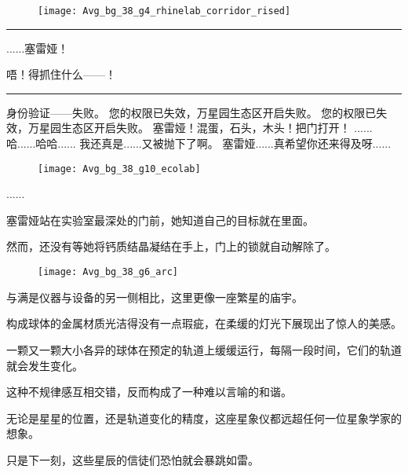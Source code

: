 \documentclass[openany]{book}
\begin{document}
\begin{dialogue}
\begin{figure}[h]
        \centering
        \texttt{[image: Avg\_bg\_38\_g4\_rhinelab\_corridor\_rised]}
    \end{figure}
    \par\noindent\rule{\textwidth}{0.4pt}
     ......塞雷娅！\par
     唔！得抓住什么——！
    \par\noindent\rule{\textwidth}{0.4pt}
     身份验证——失败。
     您的权限已失效，万星园生态区开启失败。
     您的权限已失效，万星园生态区开启失败。
     塞雷娅！混蛋，石头，木头！把门打开！
     ......
     哈......哈哈......
     我还真是......又被抛下了啊。
     塞雷娅......真希望你还来得及呀......
    \begin{figure}[h]
        \centering
        \texttt{[image: Avg\_bg\_38\_g10\_ecolab]}
    \end{figure}
     ......
\end{dialogue}\par

塞雷娅站在实验室最深处的门前，她知道自己的目标就在里面。\par
然而，还没有等她将钙质结晶凝结在手上，门上的锁就自动解除了。\par
\begin{figure}[h]
    \centering
    \texttt{[image: Avg\_bg\_38\_g6\_arc]}
\end{figure}
与满是仪器与设备的另一侧相比，这里更像一座繁星的庙宇。\par
构成球体的金属材质光洁得没有一点瑕疵，在柔缓的灯光下展现出了惊人的美感。\par
一颗又一颗大小各异的球体在预定的轨道上缓缓运行，每隔一段时间，它们的轨道就会发生变化。\par
这种不规律感互相交错，反而构成了一种难以言喻的和谐。\par
无论是星星的位置，还是轨道变化的精度，这座星象仪都远超任何一位星象学家的想象。\par
只是下一刻，这些星辰的信徒们恐怕就会暴跳如雷。
\end{document}
